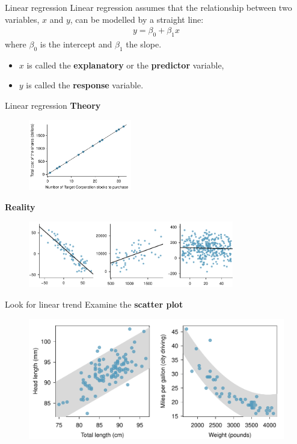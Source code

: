 \documentclass[12pt,a4paper]{beamer}
\begin{document}
\begin{frame}{Linear regression}
	Linear regression assumes that the relationship between two variables, $x$ and $y$, can be modelled by a straight line:
	\begin{eqnarray*}
	y = \beta_0 + \beta_1x
	\end{eqnarray*}
	where $\beta_0$ is the intercept and $\beta_1$ the slope.
	\vspace{0.1cm}
	
	\begin{itemize}
		\item $x$ is called the \textbf{explanatory} or the \textbf{predictor} variable,
		\item $y$ is called the \textbf{response} variable.
	\end{itemize}
	
	
\end{frame}
\begin{frame}{Linear regression}
	\textbf{Theory}
	\begin{figure}
	   \centering
	   \includegraphics[width=0.4\textwidth]{figures/perfLinearModel/perfLinearModel}
	\end{figure}
	\textbf{Reality}
	\begin{figure}
	   \centering
	   \includegraphics[width=0.8\textwidth]{figures/imperfLinearModel/imperfLinearModel}
	   \label{imperfLinearModel}
	\end{figure}
\end{frame}
	\begin{frame}{Look for linear trend}
		Examine the \textbf{scatter plot}
		\begin{figure}
		   \centering
		   \includegraphics[width=\textwidth]{figures/scattHeadLTotalLTube/scattHeadLTotalLTube}
		\end{figure}
	\end{frame}
\end{document}
